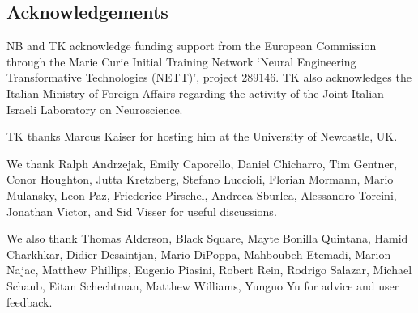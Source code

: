 \documentclass[10pt,twocolumn]{elsart5p}
\begin{document}
\begin{thanks}
\section{\label{s:Acknowledgement} \textbf{Acknowledgements}}

NB and TK acknowledge funding support from the European Commission through the Marie Curie Initial Training 	Network `Neural Engineering Transformative Technologies (NETT)', project 289146. TK also acknowledges the Italian Ministry of Foreign Affairs regarding the activity of the Joint Italian-Israeli Laboratory on Neuroscience.

TK thanks Marcus Kaiser for hosting him at the University of Newcastle, UK.
     
We thank Ralph Andrzejak, Emily Caporello, Daniel Chicharro, Tim Gentner, Conor Houghton, Jutta Kretzberg, Stefano Luccioli, Florian Mormann, Mario Mulansky, Leon Paz, Friederice Pirschel, Andreea Sburlea, Alessandro Torcini, Jonathan Victor, and Sid Visser for useful discussions.

We also thank Thomas Alderson, Black Square, Mayte Bonilla Quintana, Hamid Charkhkar, Didier Desaintjan, Mario DiPoppa, Mahboubeh Etemadi, Marion Najac, Matthew Phillips, Eugenio Piasini, Robert Rein, Rodrigo Salazar, Michael Schaub, Eitan Schechtman, Matthew Williams, Yunguo Yu for advice and user feedback.


\end{thanks}
\end{document}
